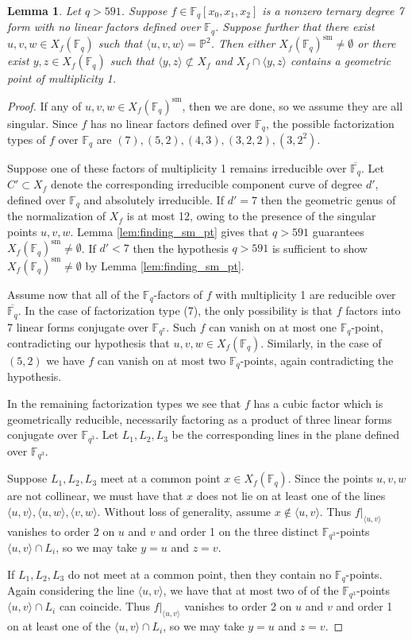 \documentclass{amsart}
\newcommand{\F}{\mathbb{F}}
\renewcommand{\P}{\mathbb{P}}
\newcommand{\Span}[1]{\langle #1 \rangle}
\newcommand{\sm}{\mathrm{sm}}
\newtheorem{lemma}[theorem]{Lemma}
\theoremstyle{definition}
\numberwithin{equation}{section}
\numberwithin{table}{section}
\newcommand{\qbound}[1]{{\color{cyan}$q > {#1}$}}
\renewcommand{\qbound}[1]{{$q > {#1}$}}
\begin{document}
\begin{lemma}
\label{lem:plane_with_3pts}
    Let \qbound{591}. Suppose $f \in \F_q[x_0, x_1, x_2]$ is a nonzero ternary degree 7 form with no linear factors defined over $\F_q$. Suppose further that there exist $u,v,w \in X_f(\F_q)$ such that $\Span{u,v,w} = \P^2$. Then either $X_f(\F_q)^{\sm} \neq \emptyset$ or there exist $y,z \in X_f(\F_q)$ such that $\Span{y,z} \not\subset X_f$ and $X_f \cap \Span{y,z}$ contains a geometric point of multiplicity 1.
\end{lemma}

\begin{proof}
    If any of $u,v,w \in X_f(\F_q)^\sm$, then we are done, so we assume they are all singular. Since $f$ has no linear factors defined over $\F_q$, the possible factorization types of $f$ over $\F_q$ are $(7), (5, 2), (4, 3), (3, 2, 2), (3, 2^2)$. 

    Suppose one of these factors of multiplicity 1 remains irreducible over $\overline{\F_q}$. Let $C' \subset X_f$ denote the corresponding irreducible component curve of degree $d'$, defined over $\F_q$ and absolutely irreducible. If $d' = 7$ then the geometric genus of the normalization of $X_f$ is at most 12, owing to the presence of the singular points $u,v,w$. Lemma \ref{lem:finding_sm_pt} gives that \qbound{591} guarantees $X_f(\F_q)^{\sm} \neq \emptyset$. If $d' < 7$ then the hypothesis \qbound{591} is sufficient to show $X_f(\F_q)^\sm \neq \emptyset$ by Lemma \ref{lem:finding_sm_pt}.

    Assume now that all of the $\F_q$-factors of $f$ with multiplicity 1 are reducible over $\overline{\F_q}$. In the case of factorization type (7), the only possibility is that $f$ factors into 7 linear forms conjugate over $\F_{q^7}$. Such $f$ can vanish on at most one $\F_q$-point, contradicting our hypothesis that $u,v,w \in X_f(\F_q)$. Similarly, in the case of $(5,2)$ we have $f$ can vanish on at most two $\F_q$-points, again contradicting the hypothesis.

    In the remaining factorization types we see that $f$ has a cubic factor which is geometrically reducible, necessarily factoring as a product of three linear forms conjugate over $\F_{q^3}$. Let $L_1, L_2, L_3$ be the corresponding lines in the plane defined over $\F_{q^3}$.

    Suppose $L_1, L_2, L_3$ meet at a common point $x \in X_f(\F_q)$. Since the points $u,v,w$ are not collinear, we must have that $x$ does not lie on at least one of the lines $\Span{u,v}, \Span{u,w}, \Span{v,w}$. Without loss of generality, assume $x \notin \Span{u,v}$. Thus $f|_{\Span{u,v}}$ vanishes to order 2 on $u$ and $v$ and order 1 on the three distinct $\F_{q^3}$-points $\Span{u,v} \cap L_i$, so we may take $y = u$ and $z = v$.

    If $L_1, L_2, L_3$ do not meet at a common point, then they contain no $\F_q$-points. Again considering the line $\Span{u,v}$, we have that at most two of of the $\F_{q^3}$-points $\Span{u,v} \cap L_i$ can coincide. Thus $f|_{\Span{u,v}}$ vanishes to order 2 on $u$ and $v$ and order 1 on at least one of the $\Span{u,v} \cap L_i$, so we may take $y = u$ and $z = v$.
\end{proof}
\end{document}
